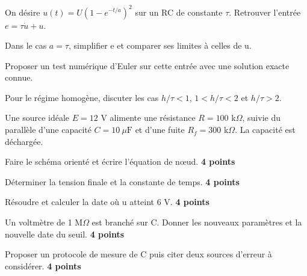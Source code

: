 \label{ex-D3}
\begin{questions}
\item On désire $u(t)=U(1-e^{-t/a})^2$ sur un RC de constante $\tau$. Retrouver l’entrée $e=\tau\dot u+u$.
\item Dans le cas $a=\tau$, simplifier e et comparer ses limites à celles de u.
\item Proposer un test numérique d’Euler sur cette entrée avec une solution exacte connue.
\item Pour le régime homogène, discuter les cas $h/\tau<1$, $1<h/\tau<2$ et $h/\tau>2$.
\end{questions}


Une source idéale $E=12$ V alimente une résistance $R=100$ k$\Omega$, suivie du parallèle d’une capacité $C=10\ \mu\mathrm{ F}$ et d’une fuite $R_f=300$ k$\Omega$. La capacité est déchargée.\begin{questions}
\item Faire le schéma orienté et écrire l’équation de nœud. \textbf{4 points}
\item Déterminer la tension finale et la constante de temps. \textbf{4 points}
\item Résoudre et calculer la date où u atteint 6 V. \textbf{4 points}
\item Un voltmètre de 1 M$\Omega$ est branché sur C. Donner les nouveaux paramètres et la nouvelle date du seuil. \textbf{4 points}
\item Proposer un protocole de mesure de C puis citer deux sources d’erreur à considérer. \textbf{4 points}
\end{questions}


